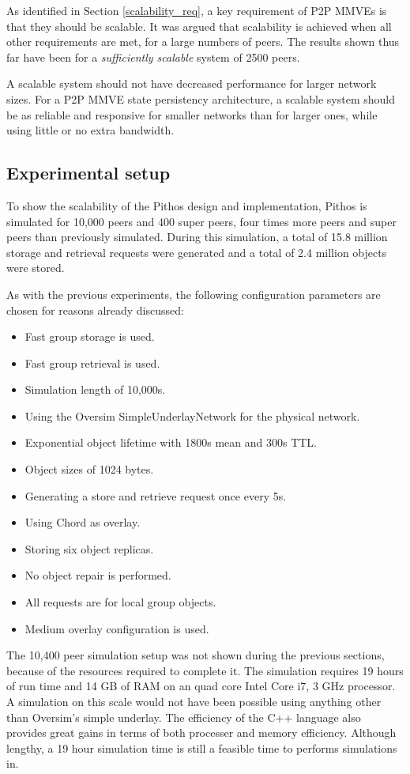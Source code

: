 As identified in Section \ref{scalability_req}, a key requirement of P2P MMVEs is that they should be scalable. It was argued that scalability is achieved when all other requirements are met, for a large numbers of peers. The results shown thus far have been for a \emph{sufficiently scalable} system of 2500 peers.

A scalable system should not have decreased performance for larger network sizes. For a P2P MMVE state persistency architecture, a scalable system should be as reliable and responsive for smaller networks than for larger ones, while using little or no extra bandwidth.

\subsection{Experimental setup}

To show the scalability of the Pithos design and implementation, Pithos is simulated for 10,000 peers and 400 super peers, four times more peers and super peers than previously simulated. During this simulation, a total of 15.8 million storage and retrieval requests were generated and a total of 2.4 million objects were stored.

As with the previous experiments, the following configuration parameters are chosen for reasons already discussed:
%
\begin{itemize}
\item Fast group storage is used.
\item Fast group retrieval is used.
\item Simulation length of 10,000s.
\item Using the Oversim SimpleUnderlayNetwork for the physical network.
\item Exponential object lifetime with 1800s mean and 300s TTL.
\item Object sizes of 1024 bytes.
\item Generating a store and retrieve request once every 5s.
\item Using Chord as overlay.
\item Storing six object replicas.
\item No object repair is performed.
\item All requests are for local group objects.
\item Medium overlay configuration is used.
\end{itemize}


The 10,400 peer simulation setup was not shown during the previous sections, because of the resources required to complete it. The simulation requires 19 hours of run time and 14 GB of RAM on an quad core Intel Core i7, 3 GHz processor. A simulation on this scale would not have been possible using anything other than Oversim's simple underlay. The efficiency of the C++ language also provides great gains in terms of both processer and memory efficiency. Although lengthy, a 19 hour simulation time is still a feasible time to performs simulations in.

